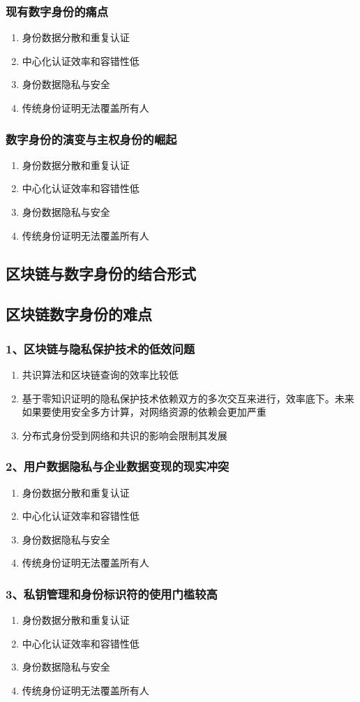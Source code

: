 \documentclass[11pt]{beamer}
\begin{document}
\begin{frame}
	\frametitle{现有数字身份的痛点}
	\begin{enumerate}
		\item 身份数据分散和重复认证
		\item 中心化认证效率和容错性低
		\item 身份数据隐私与安全
		\item 传统身份证明无法覆盖所有人
	\end{enumerate}
\end{frame}

\begin{frame}
	\frametitle{数字身份的演变与主权身份的崛起}
	\begin{enumerate}
		\item 身份数据分散和重复认证
		\item 中心化认证效率和容错性低
		\item 身份数据隐私与安全
		\item 传统身份证明无法覆盖所有人
	\end{enumerate}
\end{frame}

\subsection{区块链与数字身份的结合形式}

\subsection{区块链数字身份的难点}
\begin{frame}
	\frametitle{1、区块链与隐私保护技术的低效问题}
	\begin{enumerate}
		\item 共识算法和区块链查询的效率比较低
		\item 基于零知识证明的隐私保护技术依赖双方的多次交互来进行，效率底下。未来如果要使用安全多方计算，对网络资源的依赖会更加严重
		\item 分布式身份受到网络和共识的影响会限制其发展
	\end{enumerate}
\end{frame}

\begin{frame}
	\frametitle{2、用户数据隐私与企业数据变现的现实冲突}
	\begin{enumerate}
		\item 身份数据分散和重复认证
		\item 中心化认证效率和容错性低
		\item 身份数据隐私与安全
		\item 传统身份证明无法覆盖所有人
	\end{enumerate}
\end{frame}

\begin{frame}
	\frametitle{3、私钥管理和身份标识符的使用门槛较高}
	\begin{enumerate}
		\item 身份数据分散和重复认证
		\item 中心化认证效率和容错性低
		\item 身份数据隐私与安全
		\item 传统身份证明无法覆盖所有人
	\end{enumerate}
\end{frame}
\end{document}
